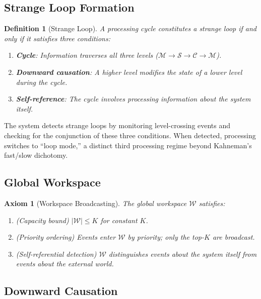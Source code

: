 \documentclass[11pt,a4paper]{article}
\newtheorem{definition}{Definition}[section]
\newtheorem{axiom}{Axiom}[section]
\newcommand{\GW}{\mathcal{W}}  %
\newcommand{\SM}{\mathcal{S}}  %
\newcommand{\WM}{\mathcal{M}}  %
\newcommand{\MC}{\mathcal{C}}  %
\begin{document}
\subsection{Strange Loop Formation}

\begin{definition}[Strange Loop]
\label{def:strange-loop}
A processing cycle constitutes a \emph{strange loop} if and only if
it satisfies three conditions:
\begin{enumerate}
  \item \textbf{Cycle}: Information traverses all three levels
        ($\WM \to \SM \to \MC \to \WM$).
  \item \textbf{Downward causation}: A higher level modifies the
        state of a lower level during the cycle.
  \item \textbf{Self-reference}: The cycle involves processing
        information \emph{about the system itself}.
\end{enumerate}
\end{definition}

The system detects strange loops by monitoring level-crossing events and
checking for the conjunction of these three conditions. When detected,
processing switches to ``loop mode,'' a distinct third processing
regime beyond Kahneman's fast/slow dichotomy.

\subsection{Global Workspace}

\begin{axiom}[Workspace Broadcasting]
\label{ax:workspace}
The global workspace $\GW$ satisfies:
\begin{enumerate}
  \item[\textbf{B1}] (Capacity bound) $|\GW| \leq K$ for constant $K$.
  \item[\textbf{B2}] (Priority ordering) Events enter $\GW$ by
        priority; only the top-$K$ are broadcast.
  \item[\textbf{B3}] (Self-referential detection) $\GW$ distinguishes
        events about the system itself from events about the external world.
\end{enumerate}
\end{axiom}

\subsection{Downward Causation}
\end{document}
